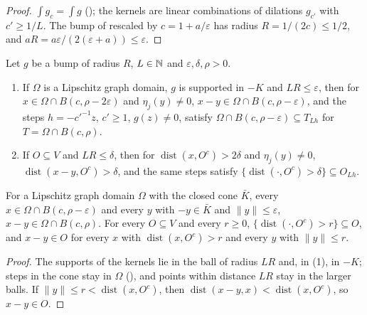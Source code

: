 \begin{proof}
\leanok
$\int g_c = \int g$ (); the kernels are linear combinations of dilations
$g_{c'}$ with $c' \geq 1/L$. The bump of  rescaled by
$c = 1 + a/\varepsilon$ has radius $R = 1/(2c) \leq 1/2$, and
$a R = a\varepsilon / (2(\varepsilon + a)) \leq \varepsilon$.
\end{proof}

\begin{lemma}[Patches]
\label{lem:patches}
\leanok
{}
Let $g$ be a bump of radius $R$, $L \in \mathbb{N}$ and $\varepsilon, \delta, \rho > 0$.
\begin{enumerate}
  \item If $\Omega$ is a Lipschitz graph domain, $g$ is supported in $-K$ and $L R \leq \varepsilon$,
    then for $x \in \Omega \cap B(c, \rho - 2\varepsilon)$ and $\eta_j(y) \neq 0$,
    $x - y \in \Omega \cap B(c, \rho - \varepsilon)$, and the steps $h = -c'^{-1} z$, $c' \geq 1$,
    $g(z) \neq 0$, satisfy $\Omega \cap B(c, \rho - \varepsilon) \subseteq T_{Lh}$ for
    $T = \Omega \cap B(c, \rho)$.
  \item If $O \subseteq V$ and $L R \leq \delta$, then for $\operatorname{dist}(x, O^c) > 2\delta$ and
    $\eta_j(y) \neq 0$, $\operatorname{dist}(x - y, O^c) > \delta$, and the same steps satisfy
    $\{\operatorname{dist}(\cdot, O^c) > \delta\} \subseteq O_{Lh}$.
\end{enumerate}
For a Lipschitz graph domain $\Omega$ with the closed cone $\bar K$, every
$x \in \Omega \cap B(c, \rho - \varepsilon)$ and every $y$ with $-y \in \bar K$ and
$\|y\| \leq \varepsilon$, $x - y \in \Omega \cap B(c, \rho)$. For every $O \subseteq V$ and every
$r \geq 0$, $\{\operatorname{dist}(\cdot, O^c) > r\} \subseteq O$, and $x - y \in O$ for every
$x$ with $\operatorname{dist}(x, O^c) > r$ and every $y$ with $\|y\| \leq r$.
\end{lemma}

\begin{proof}
\leanok
The supports of the kernels lie in the ball of radius $L R$ and, in (1), in $-K$; steps in the
cone stay in $\Omega$ (), and points within distance $L R$ stay in the larger
balls. If $\|y\| \leq r < \operatorname{dist}(x, O^c)$, then
$\operatorname{dist}(x - y, x) < \operatorname{dist}(x, O^c)$, so $x - y \in O$.
\end{proof}

